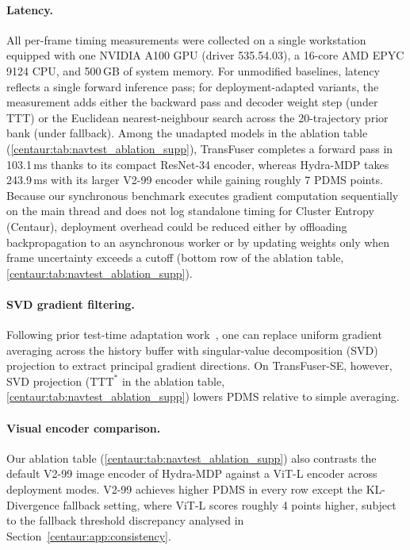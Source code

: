 \paragraph{Latency.} All per-frame timing measurements were collected on a single workstation equipped with one NVIDIA A100 GPU (driver 535.54.03), a 16-core AMD EPYC 9124 CPU, and 500\,GB of system memory. For unmodified baselines, latency reflects a single forward inference pass; for deployment-adapted variants, the measurement adds either the backward pass and decoder weight step (under TTT) or the Euclidean nearest-neighbour search across the 20-trajectory prior bank (under fallback). Among the unadapted models in the ablation table (\ref{centaur:tab:navtest_ablation_supp}), TransFuser completes a forward pass in 103.1\,ms thanks to its compact ResNet-34 encoder, whereas Hydra-MDP takes 243.9\,ms with its larger \mbox{V2-99} encoder while gaining roughly 7 PDMS points. Because our synchronous benchmark executes gradient computation sequentially on the main thread and does not log standalone timing for Cluster Entropy (Centaur), deployment overhead could be reduced either by offloading backpropagation to an asynchronous worker or by updating weights only when frame uncertainty exceeds a cutoff (bottom row of the ablation table, \ref{centaur:tab:navtest_ablation_supp}).

\paragraph{SVD gradient filtering.} Following prior test-time adaptation work~\cite{Gao2024fstta}, one can replace uniform gradient averaging across the history buffer with singular-value decomposition (SVD) projection to extract principal gradient directions. On TransFuser-SE, however, SVD projection ($\text{TTT}^{*}$ in the ablation table, \ref{centaur:tab:navtest_ablation_supp}) lowers PDMS relative to simple averaging.

\paragraph{Visual encoder comparison.} Our ablation table (\ref{centaur:tab:navtest_ablation_supp}) also contrasts the default \mbox{V2-99} image encoder of Hydra-MDP against a ViT-L encoder across deployment modes. \mbox{V2-99} achieves higher PDMS in every row except the KL-Divergence fallback setting, where ViT-L scores roughly 4 points higher, subject to the fallback threshold discrepancy analysed in Section~\ref{centaur:app:consistency}.

